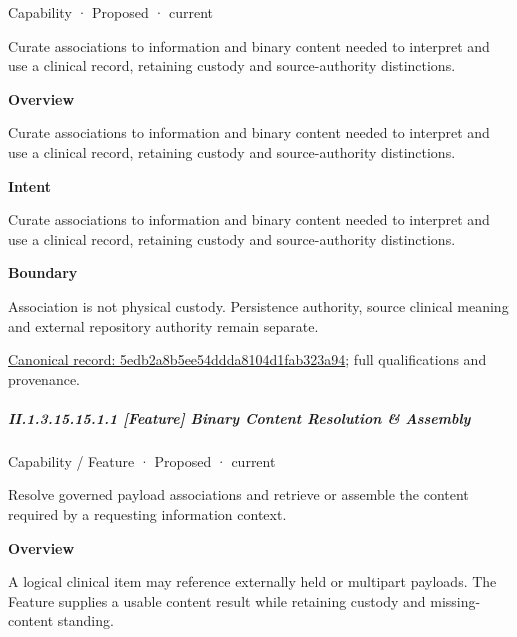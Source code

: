 \label{element:5edb2a8b5ee54ddda8104d1fab323a94}
{\small Capability · Proposed · current}\par

Curate associations to information and binary content needed to interpret and use a clinical record, retaining custody and source-authority distinctions.



\textbf{Overview}



Curate associations to information and binary content needed to interpret and use a clinical record, retaining custody and source-authority distinctions.



\textbf{Intent}



Curate associations to information and binary content needed to interpret and use a clinical record, retaining custody and source-authority distinctions.



\textbf{Boundary}



Association is not physical custody. Persistence authority, source clinical meaning and external repository authority remain separate.


{\footnotesize \href{../../../../continuum/strategy/capability/5edb2a8b5ee54ddda8104d1fab323a94.md}{Canonical record: 5edb2a8b5ee54ddda8104d1fab323a94}; full qualifications and provenance.}\par
\subparagraph*{II.1.3.15.15.1.1 [Feature] Binary Content Resolution \& Assembly}
\label{navigation:II.1.3.15.15.1.1}

\label{element:8fb4036f7a9c47c3883b2507528fab5e}
{\small Capability / Feature · Proposed · current}\par

Resolve governed payload associations and retrieve or assemble the content required by a requesting information context.



\textbf{Overview}



A logical clinical item may reference externally held or multipart payloads. The Feature supplies a usable content result while retaining custody and missing-content standing.



